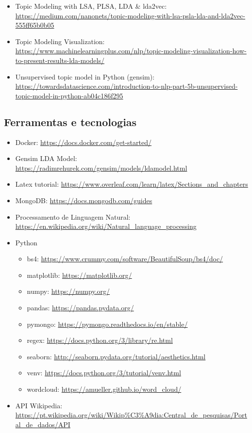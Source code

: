 \begin{itemize}
    \item Topic Modeling with LSA, PLSA, LDA \& lda2vec: \url{https://medium.com/nanonets/topic-modeling-with-lsa-psla-lda-and-lda2vec-555ff65b0b05}
    \item Topic Modeling Visualization: \url{https://www.machinelearningplus.com/nlp/topic-modeling-visualization-how-to-present-results-lda-models/}
    \item Unsupervised topic model in Python (gensim): \url{https://towardsdatascience.com/introduction-to-nlp-part-5b-unsupervised-topic-model-in-python-ab04c186f295}
\end{itemize}

\subsection{Ferramentas e tecnologias}

\begin{itemize}
    \item Docker: \url{https://docs.docker.com/get-started/}
    \item Gensim LDA Model: \url{https://radimrehurek.com/gensim/models/ldamodel.html}
    \item Latex tutorial: \url{https://www.overleaf.com/learn/latex/Sections\_and\_chapters}
    \item MongoDB: \url{https://docs.mongodb.com/guides}
    \item Processamento de Linguagem Natural: \url{https://en.wikipedia.org/wiki/Natural_language_processing}
    \item Python
    \begin{itemize}
        \item bs4: \url{https://www.crummy.com/software/BeautifulSoup/bs4/doc/}
        \item matplotlib: \url{https://matplotlib.org/}
        \item numpy: \url{https://numpy.org/}
        \item pandas: \url{https://pandas.pydata.org/}
        \item pymongo: \url{https://pymongo.readthedocs.io/en/stable/}
        \item regex: \url{https://docs.python.org/3/library/re.html}
        \item seaborn: \url{http://seaborn.pydata.org/tutorial/aesthetics.html}
        \item venv: \url{https://docs.python.org/3/tutorial/venv.html}
        \item wordcloud: \url{https://amueller.github.io/word_cloud/}
    \end{itemize}
    \item API Wikipedia: \url{https://pt.wikipedia.org/wiki/Wikip%C3%A9dia:Central_de_pesquisas/Portal_de_dados/API}
\end{itemize}